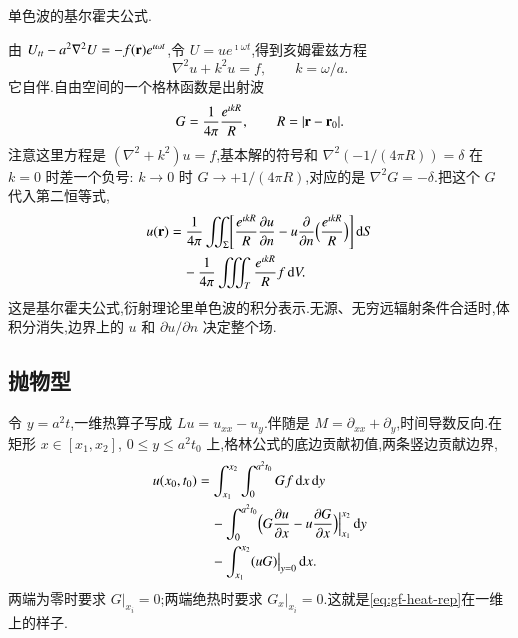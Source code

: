 \begin{example}
单色波的基尔霍夫公式.
\end{example}
\begin{solution}
由 $U_{tt}-a^2\nabla^2 U=-f({\mathbf{r}})e^{\imath\omega t}$,令 $U=u e^{\imath\omega t}$,得到亥姆霍兹方程
\begin{equation}
  \nabla^2 u+k^2 u=f,
  \qquad k=\omega/a.
\end{equation}
它自伴.自由空间的一个格林函数是出射波
\begin{equation}
  G=\frac{1}{4\pi}\frac{e^{\imath k R}}{R},
  \qquad R=|{\mathbf{r}}-{\mathbf{r}}_0|.
\end{equation}
注意这里方程是 $(\nabla^2+k^2)u=f$,基本解的符号和 $\nabla^2( -1/(4\pi R) )=\delta$ 在 $k=0$ 时差一个负号: $k\to 0$ 时 $G\to +1/(4\pi R)$,对应的是 $\nabla^2 G=-\delta$.把这个 $G$ 代入第二恒等式,
\begin{equation}
\begin{aligned}
  u({\mathbf{r}})
  &=\frac{1}{4\pi}\iint_{\Sigma}\Biggl[
      \frac{e^{\imath k R}}{R}\frac{\partial u}{\partial n}
      -u\frac{\partial}{\partial n}\Bigl(\frac{e^{\imath k R}}{R}\Bigr)
    \Biggr]\,\mathrm{d}S \\
  &\quad-\frac{1}{4\pi}\iiint_{T}\frac{e^{\imath k R}}{R}f\,\mathrm{d}V.
\end{aligned}
\label{eq:gf-kirchhoff}
\end{equation}
这是基尔霍夫公式,衍射理论里单色波的积分表示.无源、无穷远辐射条件合适时,体积分消失,边界上的 $u$ 和 $\partial u/\partial n$ 决定整个场.
\end{solution}

\subsection{抛物型}
令 $y=a^2 t$,一维热算子写成 $Lu=u_{xx}-u_y$.伴随是 $M=\partial_{xx}+\partial_y$,时间导数反向.在矩形 $x\in[x_1,x_2]$, $0\leq y\leq a^2 t_0$ 上,格林公式的底边贡献初值,两条竖边贡献边界,
\begin{equation}
\begin{aligned}
  u(x_0,t_0)
  &=\int_{x_1}^{x_2}\int_0^{a^2 t_0} G f\,\mathrm{d}x\,\mathrm{d}y \\
  &\quad-\int_0^{a^2 t_0}
      \Bigl(G\frac{\partial u}{\partial x}-u\frac{\partial G}{\partial x}\Bigr)
      \Big|_{x_1}^{x_2}\,\mathrm{d}y \\
  &\quad-\int_{x_1}^{x_2}(u G)\big|_{y=0}\,\mathrm{d}x.
\end{aligned}
\end{equation}
两端为零时要求 $G|_{x_i}=0$;两端绝热时要求 $G_x|_{x_i}=0$.这就是\eqref{eq:gf-heat-rep}在一维上的样子.

